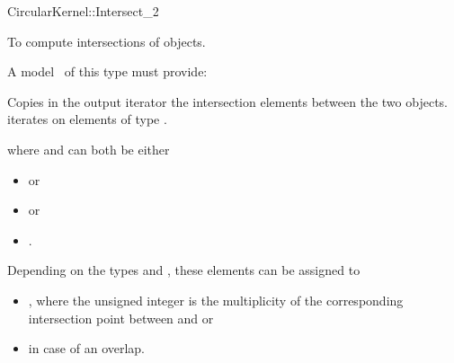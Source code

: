 \begin{ccRefFunctionObjectConcept}{CircularKernel::Intersect_2}

\ccDefinition

To compute intersections of objects.

\ccRefines



A model \ccVar\ of this type must provide:

{Copies in the output iterator the intersection elements between the
two objects.  iterates on
elements of type .}

where  and  can both be either
\begin{itemize}
\item {}  or
\item {}  or
\item {} .
\end{itemize} 

Depending on the types  and , these elements can be
assigned to 
\begin{itemize}
\item {} ,
where the unsigned integer is the multiplicity of the corresponding
intersection point between  and  or
\item {}  in case of an overlap.
\end{itemize} 



\end{ccRefFunctionObjectConcept}
